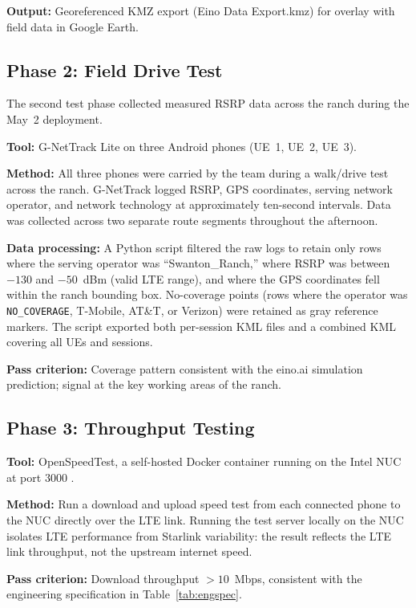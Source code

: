 \documentclass[
    left=1.5in,
    right=1.25in,
    top=1.25in,
    bottom=1.25in
]{CalPolySeniorProject}
\begin{document}
\textbf{Output:} Georeferenced KMZ export (Eino Data Export.kmz) for overlay
with field data in Google Earth.

\subsection{Phase 2: Field Drive Test}

The second test phase collected measured RSRP data across the ranch during the
May~2 deployment.

\textbf{Tool:} G-NetTrack Lite \autocite{gnettrack} on three Android phones (UE~1,
UE~2, UE~3).

\textbf{Method:} All three phones were carried by the team during a walk/drive
test across the ranch. G-NetTrack logged RSRP, GPS coordinates, serving network
operator, and network technology at approximately ten-second intervals. Data was
collected across two separate route segments throughout the afternoon.

\textbf{Data processing:} A Python script filtered the raw logs to retain only
rows where the serving operator was
``Swanton\_Ranch,'' where RSRP was between $-130$ and $-50$~dBm (valid LTE
range), and where the GPS coordinates fell within the ranch bounding box.
No-coverage points (rows where the operator was \texttt{NO\_COVERAGE}, T-Mobile,
AT\&T, or Verizon) were retained as gray reference markers. The script exported
both per-session KML files and a combined KML covering all UEs and sessions.

\textbf{Pass criterion:} Coverage pattern consistent with the eino.ai simulation
prediction; signal at the key working areas of the ranch.

\subsection{Phase 3: Throughput Testing}

\textbf{Tool:} OpenSpeedTest, a self-hosted Docker container running on the
Intel NUC at port 3000 \autocite{waveriders2025open5g2go}.

\textbf{Method:} Run a download and upload speed test from each connected phone
to the NUC directly over the LTE link. Running the test server locally on the
NUC isolates LTE performance from Starlink variability: the result reflects the
LTE link throughput, not the upstream internet speed.

\textbf{Pass criterion:} Download throughput $>10$~Mbps, consistent with the
engineering specification in Table~\ref{tab:engspec}.
\end{document}
